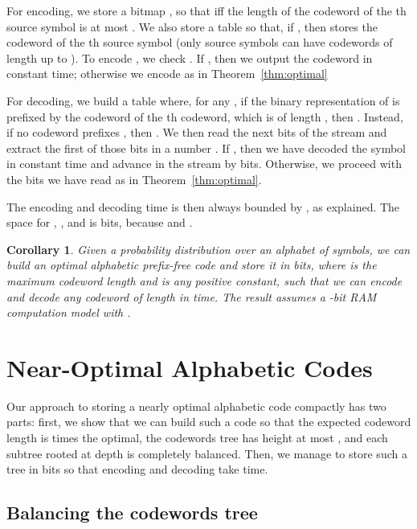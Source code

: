 \documentclass[preprint,12pt]{elsarticle}
\newtheorem{corollary}[theorem]{Corollary}
\begin{document}
For encoding, we store a bitmap , so that  iff the
length of the codeword of the th source symbol is at most . We also 
store a table  so that, if , then  stores 
the codeword of the th source symbol (only  source symbols can have
codewords of length up to ). To encode , we check
. If , then we output the codeword  in constant
time; otherwise we encode  as in Theorem~\ref{thm:optimal}

For decoding, we build a table  where, for any 
, if the binary representation of  is prefixed by the 
codeword of the th codeword, which is of length , then
. Instead, if no codeword prefixes , then .
We then read the next  bits of the stream and extract the first  of those
 bits in a number . If , then we have decoded the symbol
 in constant time and advance in the stream by  bits. Otherwise, we
proceed with the  bits we have read as in Theorem~\ref{thm:optimal}.

The encoding and decoding time is then always bounded by , as 
explained. The space for , , and  is 
 bits, because  and
.

\begin{corollary}
\label{cor:optimal}
Given a probability distribution over an alphabet of  symbols, we can 
build an optimal alphabetic prefix-free code and store it in  bits, where  is the maximum codeword length and  
is any positive constant, such that we can encode and decode any codeword of 
length  in  time.
The result assumes a -bit RAM computation model with .
\end{corollary}

\section{Near-Optimal Alphabetic Codes}
\label{sec:alphabetic2}

Our approach to storing a nearly optimal alphabetic code compactly has two parts: first, we show that we can build such a code so that the expected codeword length is  times the optimal, the codewords tree  has height at most , and each subtree rooted at depth  is completely balanced. Then, we manage to store such a tree in  bits so that encoding and decoding take  time.

\subsection{Balancing the codewords tree}
\end{document}
